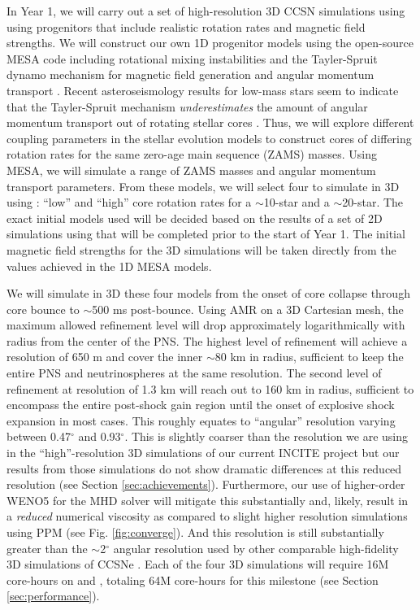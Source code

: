 In Year 1, we will carry out a set of high-resolution 3D CCSN simulations using \sparkmone using progenitors that include realistic rotation rates and magnetic field strengths.
We will construct our own 1D progenitor models using the open-source MESA code \citep{Paxton:2011, Paxton:2013, Paxton:2015} including rotational mixing instabilities and the Tayler-Spruit dynamo mechanism for magnetic field generation and angular momentum transport \citep{Spruit:2002, Heger:2005}.
Recent asteroseismology results for low-mass stars seem to indicate that the Tayler-Spruit mechanism {\it underestimates} the amount of angular momentum transport out of rotating stellar cores \citep{Cantiello:2014}.
Thus, we will explore different coupling parameters in the stellar evolution models to construct cores of differing rotation rates for the same zero-age main sequence (ZAMS) masses.
Using MESA, we will simulate a range of ZAMS masses and angular momentum transport parameters.
From these models, we will select four to simulate in 3D using \sparkmone: ``low'' and ``high'' core rotation rates for a $\sim$10-\msun star and a $\sim$20-\msun star.
The exact initial models used will be decided based on the results of a set of 2D simulations using \sparkmone that will be completed prior to the start of Year 1.
The initial magnetic field strengths for the 3D simulations will be taken directly from the values achieved in the 1D MESA models.

We will simulate in 3D these four models from the onset of core collapse through core bounce to $\sim$500 ms post-bounce.
Using AMR on a 3D Cartesian mesh, the maximum allowed refinement level will drop approximately logarithmically with radius from the center of the PNS.
The highest level of refinement will achieve a resolution of 650 m and cover the inner $\sim$80 km in radius, sufficient to keep the entire PNS and neutrinospheres at the same resolution.
The second level of refinement at resolution of 1.3 km will reach out to 160 km in radius, sufficient to encompass the entire post-shock gain region until the onset of explosive shock expansion in most cases.
This roughly equates to ``angular'' resolution varying between 0.47$^\circ$ and  0.93$^\circ$.
This is slightly coarser than the resolution we are using in the ``high''-resolution 3D simulations of our current INCITE project but our results from those simulations do not show dramatic differences at this reduced resolution (see Section \ref{sec:achievements}).
Furthermore, our use of higher-order WENO5 for the MHD solver will mitigate this substantially and, likely, result in a {\it reduced} numerical viscosity as compared to slight higher resolution simulations using PPM (see Fig. \ref{fig:converge}).
And this resolution is still substantially greater than the $\sim$2$^\circ$ angular resolution used by other comparable high-fidelity 3D simulations of CCSNe \citep[e.g.,][]{Melson:2015, Lentz:2015, Janka:2016}.
Each of the four 3D simulations will require 16M core-hours on \mira and , totaling 64M core-hours for this milestone (see Section \ref{sec:performance}).

